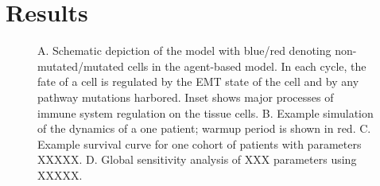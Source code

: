 \documentclass{article}
\begin{document}

\section{Results}

\begin{figure}[H]
\center
{}
\caption{A. Schematic depiction of the model with blue/red denoting non-mutated/mutated cells in the agent-based model. In each cycle, the fate of a cell is regulated by the EMT state of the cell and by any pathway mutations harbored. Inset shows major processes of immune system regulation on the tissue cells.
B. Example simulation of the dynamics of a one patient; warmup period is shown in red.
C. Example survival curve for one cohort of patients with parameters XXXXX.
D. Global sensitivity analysis of XXX parameters using XXXXX.}
\label{fig:ModelIntro}
\end{figure}
\end{document}
